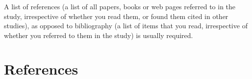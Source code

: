 A list of references (a list of all papers, books or web pages referred to in the study, irrespective of whether you read them, or found them cited in other studies), as opposed to bibliography (a list of items that you read, irrespective of whether you referred to them in the study) is usually required.

\chapter{References}